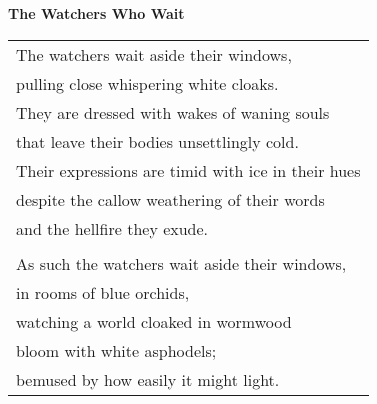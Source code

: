 \documentclass{article}
\begin{document}
\begin{center}
\textbf{The Watchers Who Wait} \\
\vspace*{2ex}
\begin{tabular}{l}
The watchers wait aside their windows, \\
pulling close whispering white cloaks. \\
They are dressed with wakes of waning souls \\
that leave their bodies unsettlingly cold. \\
Their expressions are timid with ice in their hues \\
despite the callow weathering of their words \\
and the hellfire they exude. \\
\\
As such the watchers wait aside their windows, \\
  in rooms of blue orchids, \\
watching a world cloaked in wormwood \\
  bloom with white asphodels; \\
bemused by how easily it might light. \\
\end{tabular}
\end{center}
\end{document}
